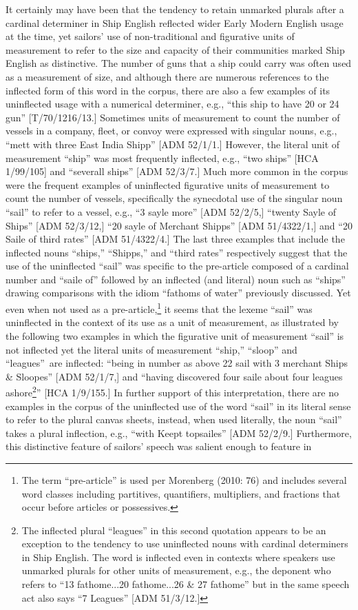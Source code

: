 \begin{styleStandard}
It certainly may have been that the tendency to retain unmarked plurals after a cardinal determiner in Ship English reflected wider Early Modern English usage at the time, yet sailors’ use of non-traditional and figurative units of measurement to refer to the size and capacity of their communities marked Ship English as distinctive. The number of guns that a ship could carry was often used as a measurement of size, and although there are numerous references to the inflected form of this word in the corpus, there are also a few examples of its uninflected usage with a numerical determiner, e.g., “this ship to have 20 or 24 gun” [T/70/1216/13.] Sometimes units of measurement to count the number of vessels in a company, fleet, or convoy were expressed with singular nouns, e.g., “mett with three East India Shipp” [ADM 52/1/1.] However, the literal unit of measurement “ship” was most frequently inflected, e.g., “two ships” [HCA 1/99/105] and “severall ships” [ADM 52/3/7.] Much more common in the corpus were the frequent examples of uninflected figurative units of measurement to count the number of vessels, specifically the synecdotal use of the singular noun “sail” to refer to a vessel, e.g., “3 sayle more” [ADM 52/2/5,] “twenty Sayle of Ships” [ADM 52/3/12,] “20 sayle of Merchant Shipps” [ADM 51/4322/1,] and “20 Saile of third rates” [ADM 51/4322/4.] The last three examples that include the inflected nouns “ships,” “Shipps,” and “third rates” respectively suggest that the use of the uninflected “sail” was specific to the pre-article composed of a cardinal number and “saile of” followed by an inflected (and literal) noun such as “ships” drawing comparisons with the idiom “fathoms of water” previously discussed. Yet even when not used as a pre-article,\footnote{ The term “pre-article” is used per Morenberg (2010: 76) and includes several word classes including partitives, quantifiers, multipliers, and fractions that occur before articles or possessives.} it seems that the lexeme “sail” was uninflected in the context of its use as a unit of measurement, as illustrated by the following two examples in which the figurative unit of measurement “sail” is not inflected yet the literal units of measurement “ship,” “sloop” and “leagues”~are inflected: “being in number as above 22 sail with 3 merchant Ships \& Sloopes” [ADM 52/1/7,] and “having discovered four saile about four leagues ashore\footnote{ The inflected plural “leagues” in this second quotation appears to be an exception to the tendency to use uninflected nouns with cardinal determiners in Ship English. The word is inflected even in contexts where speakers use unmarked plurals for other units of measurement, e.g., the deponent who refers to “13 fathome...20 fathome...26 \& 27 fathome” but in the same speech act also says “7 Leagues” [ADM 51/3/12.]}” [HCA 1/9/155.] In further support of this interpretation, there are no examples in the corpus of the uninflected use of the word “sail” in its literal sense to refer to the plural canvas sheets, instead, when used literally, the noun “sail” takes a plural inflection, e.g., “with Keept topsailes” [ADM 52/2/9.] Furthermore, this distinctive feature of sailors’ speech was salient enough to feature in 
\end{styleStandard}
